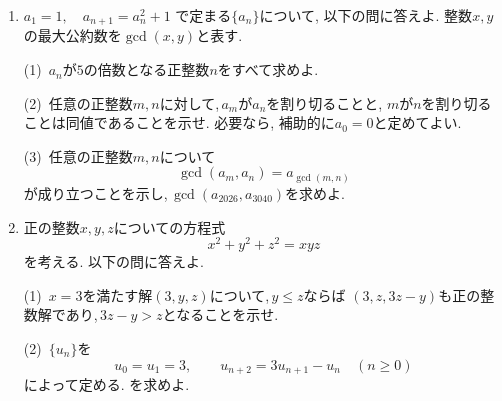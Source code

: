 \begin{enumerate}[label=\textbf{問\arabic*.},leftmargin=3.8em,format=\bookitemlink{practice-entrance}{problem}{answer}]
                \smallskip
                \noindent (2)~$n\ge3$とする. 最初の2枚に$1$を含む場合と,\,$1$を含まず$2$を含む場合に分けて数え,
                $c_n,c_{n-1},c_{n-2}$の関係式を求めよ.
                後者では, 最初の比較を済ませてから$2$の札を取り除くことを考えてよい.

                \smallskip
                \noindent (3)~$c_n$を求めよ.
                \par{}
          \item $\displaystyle a_1=1,\quad a_{n+1}=a_n^2+1$
                で定まる$\{a_n\}$について, 以下の問に答えよ.
                整数$x,y$の最大公約数を$\gcd(x,y)$と表す.

                \smallskip
                \noindent (1)~$a_n$が$5$の倍数となる正整数$n$をすべて求めよ.

                \smallskip
                \noindent (2)~任意の正整数$m,n$に対して,\,$a_m$が$a_n$を割り切ることと,
                $m$が$n$を割り切ることは同値であることを示せ.
                必要なら, 補助的に$a_0=0$と定めてよい.

                \smallskip
                \noindent (3)~任意の正整数$m,n$について
                \[
                 \gcd(a_m,a_n)=a_{\gcd(m,n)}
                \]
                が成り立つことを示し,\,$\gcd(a_{2026},a_{3040})$を求めよ.
                \par{}
          \item 正の整数$x,y,z$についての方程式
                \[
                 x^2+y^2+z^2=xyz
                \]
                を考える. 以下の問に答えよ.

                \smallskip
                \noindent (1)~$x=3$を満たす解$(3,y,z)$について,\,$y\le z$ならば
                $(3,z,3z-y)$も正の整数解であり,\,$3z-y>z$となることを示せ.

                \smallskip
                \noindent (2)~$\{u_n\}$を
                \[
                 u_0=u_1=3,\qquad
                 u_{n+2}=3u_{n+1}-u_n\quad(n\ge0)
                \]
                によって定める. を求めよ.


\end{enumerate}

